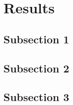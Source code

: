 
\section{Results}

\subsection{Subsection 1}

\subsection{Subsection 2}

\subsection{Subsection 3}
